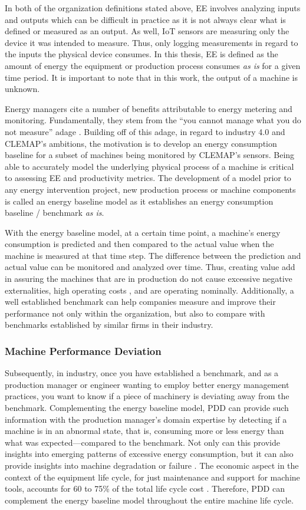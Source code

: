In both of the organization definitions stated above, EE involves analyzing inputs and outputs which can be difficult in practice as it is not always clear what is defined or measured as an output. As well, IoT sensors are measuring only the device it was intended to measure. Thus, only logging measurements in regard to the inputs the physical device consumes. In this thesis, EE is defined as the amount of energy the equipment or production process consumes \textit{as is} for a given time period. It is important to note that in this work, the output of a machine is unknown.  

Energy managers cite a number of benefits attributable to energy metering and monitoring. Fundamentally, they stem from the “you cannot manage what you do not measure” adage \cite{3M}. Building off of this adage, in regard to industry 4.0 and CLEMAP's ambitions, the motivation is to develop an energy consumption baseline for a subset of machines being monitored by CLEMAP's sensors. Being able to accurately model the underlying physical process of a machine is critical to assessing EE and productivity metrics. The development of a model prior to any energy intervention project, new production process or machine components is called an energy baseline model as it establishes an energy consumption baseline / benchmark \textit{as is}. 

With the energy baseline model, at a certain time point, a machine's energy consumption is predicted and then compared to the actual value when the machine is measured at that time step. The difference between the prediction and actual value can be monitored and analyzed over time. Thus, creating value add in assuring the machines that are in production do not cause excessive negative externalities, high operating costs \cite{eea}, and are operating nominally. Additionally, a well established benchmark can help companies measure and improve their performance not only within the organization, but also to compare with benchmarks established by similar firms in their industry.

\subsubsection{Machine Performance Deviation}

Subsequently, in industry, once you have established a benchmark, and as a production manager or engineer wanting to employ better energy management practices, you want to know if a piece of machinery is deviating away from the benchmark. Complementing the energy baseline model, PDD can provide such information with the production manager's domain expertise by detecting if a machine is in an abnormal state, that is, consuming more or less energy than what was expected—compared to the benchmark. Not only can this provide insights into emerging patterns of excessive energy consumption, but it can also provide insights into machine degradation or failure \cite{online-fault-monitoring}. The economic aspect in the context of the equipment life cycle, for just maintenance and support for machine tools, accounts for 60 to 75\% of the total life cycle cost \cite{econ-costs}. Therefore, PDD can complement the energy baseline model throughout the entire machine life cycle.

